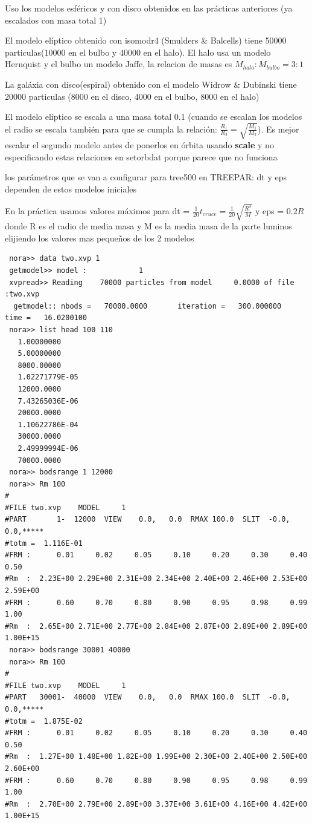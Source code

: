 \documentclass[12pt]{article} %
\renewcommand{\=}[1]{\stackrel{#1}{=}} %
\theoremstyle{definition}
\theoremstyle{remark}
\begin{document}
\begin{description}
\item Uso los modelos esféricos y con disco obtenidos en las prácticas anteriores (ya escalados con masa total 1)
\item El modelo elíptico obtenido con isomodr4 (Smulders \& Balcells) tiene 50000 particulas(10000 en el bulbo y 40000 en el halo). El halo usa un modelo Hernquist y el bulbo un modelo Jaffe, la relacion de masas es $M_{halo}:M_{bulbo} = 3:1$
\item La galáxia con disco(espiral) obtenido con el modelo Widrow \& Dubinski tiene 20000 particulas (8000 en el disco, 4000 en el bulbo, 8000 en el halo) 
\item El modelo elíptico se escala a una masa total 0.1 (cuando se escalan los modelos el radio se escala también para que se cumpla la relación: $\frac{R_1}{R_2} = \sqrt{\frac{M_1}{M_2}}$). Es mejor escalar el segundo modelo antes de ponerlos en órbita usando \textbf{scale} y no especificando estas relaciones en setorbdat porque parece que no funciona
\item los parámetros que se van a configurar para tree500 en TREEPAR: dt y eps dependen de estos modelos iniciales
\begin{description}
\item En la práctica usamos valores máximos para  dt = $\frac{1}{20} t_{cruce} = \frac{1}{20} \sqrt{\frac{R^3}{M}}$ y eps = $0.2 R$ donde R es el radio de media masa y M es la media masa de la parte luminos elijiendo los valores mas pequeños de los 2 modelos
\item
\small
\begin{verbatim}
 nora>> data two.xvp 1
 getmodel>> model :            1
 xvpread>> Reading    70000 particles from model     0.0000 of file :two.xvp                                 
  getmodel:: nbods =   70000.0000       iteration =   300.000000       time =   16.0200100    
 nora>> list head 100 110
   1.00000000    
   5.00000000    
   8000.00000    
   1.02271779E-05
   12000.0000    
   7.43265036E-06
   20000.0000    
   1.10622786E-04
   30000.0000    
   2.49999994E-06
   70000.0000    
 nora>> bodsrange 1 12000
 nora>> Rm 100
#
#FILE two.xvp    MODEL     1                                                    
#PART       1-  12000  VIEW    0.0,   0.0  RMAX 100.0  SLIT  -0.0, 0.0,*****    
#totm =  1.116E-01
#FRM :      0.01     0.02     0.05     0.10     0.20     0.30     0.40     0.50
#Rm  :  2.23E+00 2.29E+00 2.31E+00 2.34E+00 2.40E+00 2.46E+00 2.53E+00 2.59E+00
#FRM :      0.60     0.70     0.80     0.90     0.95     0.98     0.99     1.00
#Rm  :  2.65E+00 2.71E+00 2.77E+00 2.84E+00 2.87E+00 2.89E+00 2.89E+00 1.00E+15
 nora>> bodsrange 30001 40000
 nora>> Rm 100
#
#FILE two.xvp    MODEL     1                                                    
#PART   30001-  40000  VIEW    0.0,   0.0  RMAX 100.0  SLIT  -0.0, 0.0,*****    
#totm =  1.875E-02
#FRM :      0.01     0.02     0.05     0.10     0.20     0.30     0.40     0.50
#Rm  :  1.27E+00 1.48E+00 1.82E+00 1.99E+00 2.30E+00 2.40E+00 2.50E+00 2.60E+00
#FRM :      0.60     0.70     0.80     0.90     0.95     0.98     0.99     1.00
#Rm  :  2.70E+00 2.79E+00 2.89E+00 3.37E+00 3.61E+00 4.16E+00 4.42E+00 1.00E+15


\end{verbatim}
\end{description}
\end{description}
\end{document}
